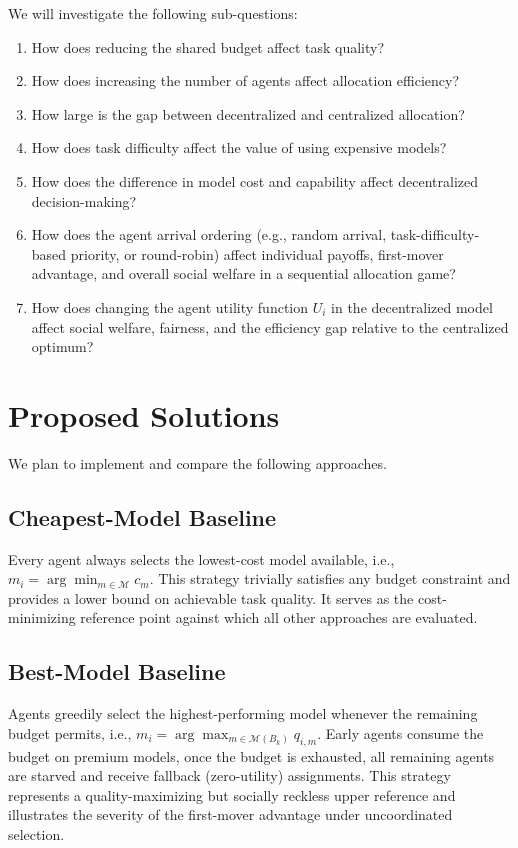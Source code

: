 \documentclass{article}
\begin{document}
We will investigate the following sub-questions: 

\begin{enumerate}[leftmargin=*] 
    \item How does reducing the shared budget affect task quality? 
    \item How does increasing the number of agents affect allocation efficiency? 
    \item How large is the gap between decentralized and centralized allocation? 
    \item How does task difficulty affect the value of using expensive models? 
    \item How does the difference in model cost and capability affect decentralized decision-making? 
    \item How does the agent arrival ordering (e.g., random arrival, task-difficulty-based priority, or round-robin) affect individual payoffs, first-mover advantage, and overall social welfare in a sequential allocation game?
    \item How does changing the agent utility function $U_i$ in the decentralized model affect social welfare, fairness, and the efficiency gap relative to the centralized optimum?
\end{enumerate}

\section{Proposed Solutions} 

We plan to implement and compare the following approaches. 

\subsection{Cheapest-Model Baseline} 

Every agent always selects the lowest-cost model available, i.e., $m_i = \arg\min_{m \in \mathcal{M}} c_m$. This strategy trivially satisfies any budget constraint and provides a lower bound on achievable task quality. It serves as the cost-minimizing reference point against which all other approaches are evaluated. 

\subsection{Best-Model Baseline} 

Agents greedily select the highest-performing model whenever the remaining budget permits, i.e., $m_i = \arg\max_{m \in \mathcal{M}(B_k)} q_{i,m}$. Early agents consume the budget on premium models, once the budget is exhausted, all remaining agents are starved and receive fallback (zero-utility) assignments. This strategy represents a quality-maximizing but socially reckless upper reference and illustrates the severity of the first-mover advantage under uncoordinated selection. 
\end{document}
